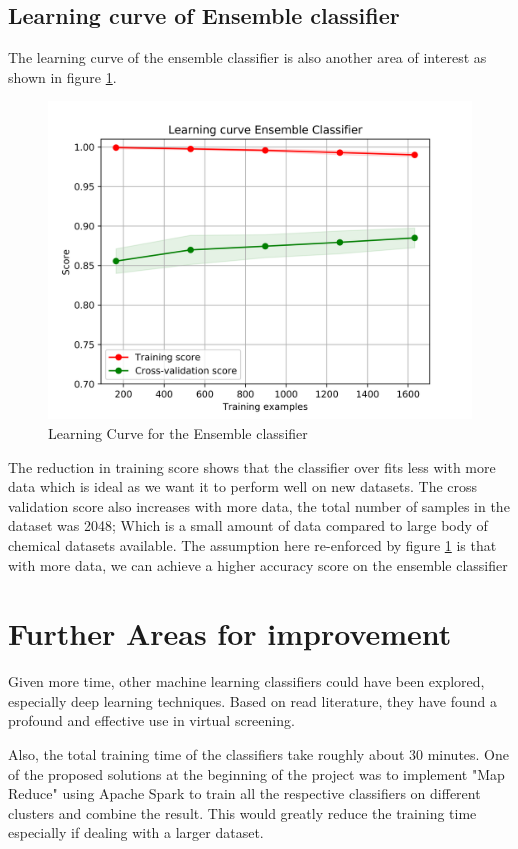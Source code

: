 \documentclass[a4paper,12pt]{article}
\begin{document}
	\subsection{Learning curve of Ensemble classifier}
	The learning curve of the ensemble classifier is also another area of interest as shown in figure \ref{fig:learning_curve_ensemble}.
		\begin{figure}[H]
			\centering
			\includegraphics[width=\textwidth,scale=1]{learning_curve_ensemble_clf}
			\caption{Learning Curve for the Ensemble classifier}
			\label{fig:learning_curve_ensemble}
		\end{figure}
	The reduction in training score shows that the classifier over fits less with more data which is ideal as we want it to perform well on new datasets. The cross validation score also increases with more data, the total number of samples in the dataset was 2048; Which is a small amount of data compared to large body of chemical datasets available. The assumption here re-enforced by figure \ref{fig:learning_curve_ensemble} is that with more data, we can achieve a higher accuracy score on the ensemble classifier
	
\section{Further Areas for improvement}
	Given more time, other machine learning classifiers could have been explored, especially deep learning techniques. Based on read literature, they have found a profound and effective use in virtual screening. 
	
	Also, the total training time of the classifiers take roughly about 30 minutes. One of the proposed solutions at the beginning of the project was to implement "Map Reduce" using Apache Spark to train all the respective classifiers on different clusters and combine the result. This would greatly reduce the training time especially if dealing with a larger dataset.
\end{document}
